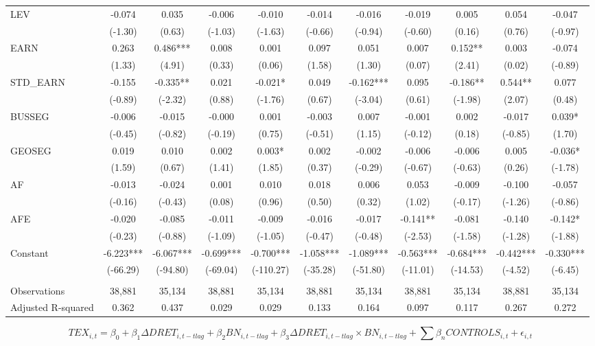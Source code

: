 \begin{table}
\begin{center}
\begin{tabular}{lcccccccccc}
			LEV & -0.074 & 0.035 & -0.006 & -0.010 & -0.014 & -0.016 & -0.019 & 0.005 & 0.054 & -0.047 \\
			& (-1.30) & (0.63) & (-1.03) & (-1.63) & (-0.66) & (-0.94) & (-0.60) & (0.16) & (0.76) & (-0.97) \\
			EARN & 0.263 & 0.486*** & 0.008 & 0.001 & 0.097 & 0.051 & 0.007 & 0.152** & 0.003 & -0.074 \\
			& (1.33) & (4.91) & (0.33) & (0.06) & (1.58) & (1.30) & (0.07) & (2.41) & (0.02) & (-0.89) \\
			STD\_EARN & -0.155 & -0.335** & 0.021 & -0.021* & 0.049 & -0.162*** & 0.095 & -0.186** & 0.544** & 0.077 \\
			& (-0.89) & (-2.32) & (0.88) & (-1.76) & (0.67) & (-3.04) & (0.61) & (-1.98) & (2.07) & (0.48) \\
			BUSSEG & -0.006 & -0.015 & -0.000 & 0.001 & -0.003 & 0.007 & -0.001 & 0.002 & -0.017 & 0.039* \\
			& (-0.45) & (-0.82) & (-0.19) & (0.75) & (-0.51) & (1.15) & (-0.12) & (0.18) & (-0.85) & (1.70) \\
			GEOSEG & 0.019 & 0.010 & 0.002 & 0.003* & 0.002 & -0.002 & -0.006 & -0.006 & 0.005 & -0.036* \\
			& (1.59) & (0.67) & (1.41) & (1.85) & (0.37) & (-0.29) & (-0.67) & (-0.63) & (0.26) & (-1.78) \\
			AF & -0.013 & -0.024 & 0.001 & 0.010 & 0.018 & 0.006 & 0.053 & -0.009 & -0.100 & -0.057 \\
			& (-0.16) & (-0.43) & (0.08) & (0.96) & (0.50) & (0.32) & (1.02) & (-0.17) & (-1.26) & (-0.86) \\
			AFE & -0.020 & -0.085 & -0.011 & -0.009 & -0.016 & -0.017 & -0.141** & -0.081 & -0.140 & -0.142* \\
			& (-0.23) & (-0.88) & (-1.09) & (-1.05) & (-0.47) & (-0.48) & (-2.53) & (-1.58) & (-1.28) & (-1.88) \\
			Constant & -6.223*** & -6.067*** & -0.699*** & -0.700*** & -1.058*** & -1.089*** & -0.563*** & -0.684*** & -0.442*** & -0.330*** \\
			& (-66.29) & (-94.80) & (-69.04) & (-110.27) & (-35.28) & (-51.80) & (-11.01) & (-14.53) & (-4.52) & (-6.45) \\
			&   &   &   &   &   &   &   &   &   &  \\
			Observations & 38,881 & 35,134 & 38,881 & 35,134 & 38,881 & 35,134 & 38,881 & 35,134 & 38,881 & 35,134 \\
			Adjusted R-squared & 0.362 & 0.437 & 0.029 & 0.029 & 0.133 & 0.164 & 0.097 & 0.117 & 0.267 & 0.272 \\
			\bottomrule
			\bottomrule
		\end{tabular}%
	\end{center}
		\begin{footnotesize}
			\setcounter{equation}{0}
			\begin{equation}
				TEX_{i,t}=\beta_0+\beta_1\Delta DRET_{i,t-tlag}+\beta_2BN_{i,t-tlag}+\beta_3\Delta DRET_{i,t-tlag}\times 	BN_{i,t-tlag}+\sum\beta_nCONTROLS_{i,t}+\epsilon_{i,t}
			\end{equation}
			

\end{footnotesize}
\end{table}
